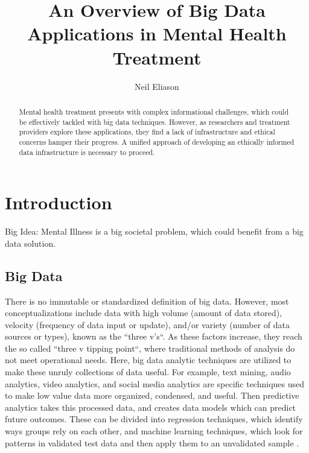 \documentclass[sigconf]{acmart}
\begin{document}
\title{An Overview of Big Data Applications in Mental Health Treatment}


\author{Neil Eliason}


\renewcommand{\shortauthors}{Eliason}


\begin{abstract}
Mental health treatment presents with complex informational challenges, which could be effectively tackled with big data techniques. However, as researchers and treatment providers explore these applications, they find a lack of infrastructure and ethical concerns hamper their progress. A unified approach of developing an ethically informed data infrastructure is necessary to proceed.

\end{abstract}



\maketitle

\section{Introduction}
Big Idea: Mental Illness is a big societal problem, which could benefit from a big data solution.

\subsection{Big Data}

There is no immutable or standardized definition of big data. However, most conceptualizations include data with high volume (amount of data stored), velocity (frequency of data input or update), and/or variety (number of data sources or types), known as the ``three v's``. As these factors increase, they reach the so called ``three v tipping point``, where traditional methods of analysis do not meet operational needs. Here, big data analytic techniques are utilized to make these unruly collections of data useful. For example, text mining, audio analytics, video analytics, and social media analytics are specific techniques used to make low value data more organized, condensed, and useful. Then predictive analytics takes this processed data, and creates data models which can predict future outcomes. These can be divided into regression techniques, which identify ways groups rely on each other, and machine learning techniques, which look for patterns in validated test data and then apply them to an unvalidated sample \cite{bdconcepts}.
\end{document}
